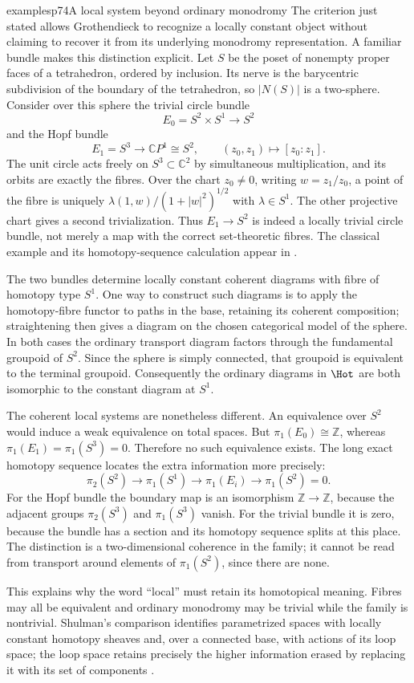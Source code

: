 \begin{dcomment}{examples}{p74}{A local system beyond ordinary monodromy}
The criterion just stated allows Grothendieck to recognize a locally constant object without claiming to recover it from its underlying monodromy representation. A familiar bundle makes this distinction explicit. Let $S$ be the poset of nonempty proper faces of a tetrahedron, ordered by inclusion. Its nerve is the barycentric subdivision of the boundary of the tetrahedron, so $|N(S)|$ is a two-sphere. Consider over this sphere the trivial circle bundle
\[
 E_0=S^2\times S^1\longrightarrow S^2
\]
and the Hopf bundle
\[
 E_1=S^3\longrightarrow\mathbb CP^1\cong S^2,
 \qquad (z_0,z_1)\longmapsto[z_0:z_1].
\]
The unit circle acts freely on $S^3\subset\mathbb C^2$ by simultaneous multiplication, and its orbits are exactly the fibres. Over the chart $z_0\ne0$, writing $w=z_1/z_0$, a point of the fibre is uniquely
$\lambda(1,w)/(1+|w|^2)^{1/2}$ with $\lambda\in S^1$. The other projective chart gives a second trivialization. Thus $E_1\to S^2$ is indeed a locally trivial circle bundle, not merely a map with the correct set-theoretic fibres. The classical example and its homotopy-sequence calculation appear in \citet[Examples~4.45 and~4.51]{Hatcher2002}.

The two bundles determine locally constant coherent diagrams with fibre of homotopy type $S^1$. One way to construct such diagrams is to apply the homotopy-fibre functor to paths in the base, retaining its coherent composition; straightening then gives a diagram on the chosen categorical model of the sphere. In both cases the ordinary transport diagram factors through the fundamental groupoid of $S^2$. Since the sphere is simply connected, that groupoid is equivalent to the terminal groupoid. Consequently the ordinary diagrams in $\Hot$ are both isomorphic to the constant diagram at $S^1$.

The coherent local systems are nonetheless different. An equivalence over $S^2$ would induce a weak equivalence on total spaces. But $\pi_1(E_0)\cong\mathbb Z$, whereas $\pi_1(E_1)=\pi_1(S^3)=0$. Therefore no such equivalence exists. The long exact homotopy sequence locates the extra information more precisely:
\[
 \pi_2(S^2)\longrightarrow\pi_1(S^1)\longrightarrow\pi_1(E_i)
 \longrightarrow\pi_1(S^2)=0.
\]
For the Hopf bundle the boundary map is an isomorphism $\mathbb Z\to\mathbb Z$, because the adjacent groups $\pi_2(S^3)$ and $\pi_1(S^3)$ vanish. For the trivial bundle it is zero, because the bundle has a section and its homotopy sequence splits at this place. The distinction is a two-dimensional coherence in the family; it cannot be read from transport around elements of $\pi_1(S^2)$, since there are none.

This explains why the word ``local'' must retain its homotopical meaning. Fibres may all be equivalent and ordinary monodromy may be trivial while the family is nontrivial. Shulman's comparison identifies parametrized spaces with locally constant homotopy sheaves and, over a connected base, with actions of its loop space; the loop space retains precisely the higher information erased by replacing it with its set of components \citep[\S\S5--6 and~8]{Shulman2008}.
\end{dcomment}

